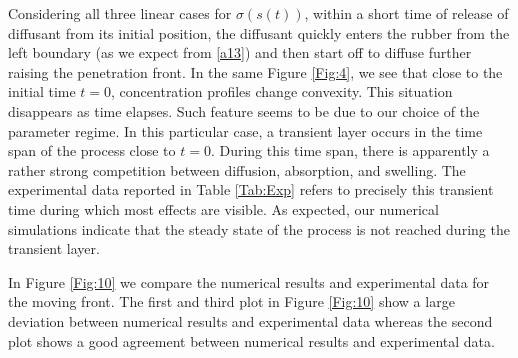 \documentclass{article}
\begin{document}
Considering  all three linear cases for $\sigma(s(t))$, within a short time
of release of diffusant from its initial position, the diffusant quickly enters the rubber from the left boundary (as we expect from \eqref{a13}) and then start off to diffuse further raising the penetration front. In the same Figure \ref{Fig:4}, we see that close to the initial time $t=0$, concentration profiles change convexity.  This situation disappears as time elapses. Such feature seems to be due to our choice of the parameter regime. In this particular case, a transient layer occurs in the time span of the process close to $t=0$. During this time span, there is apparently a rather strong  competition between diffusion, absorption, and swelling. The experimental data reported in Table \ref{Tab:Exp} refers to precisely this transient time during which most effects are visible. As expected, our numerical simulations indicate that the steady state of the process is not reached during the transient layer. 

In Figure \ref{Fig:10} we  compare the numerical results and experimental data for the moving front. The first and third plot in Figure \ref{Fig:10} show a large deviation between numerical results and  experimental data whereas the second plot shows a good agreement between numerical results and  experimental data. 

\end{document}
